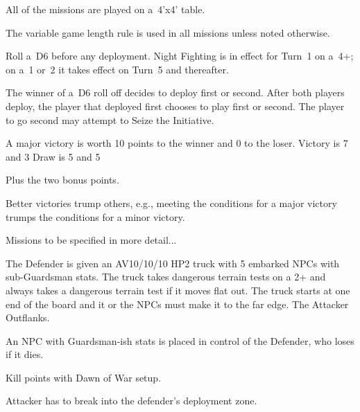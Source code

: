\clearpage

\begin{columns}


\end{columns}


\clearpage
{}


All of the missions are played on a~4'x4' table.

The variable game length rule is used in all missions unless noted otherwise.

  Roll a~D6 before any
deployment.  Night Fighting is in effect for Turn~1 on a~4+; on a~1
or~2 it takes effect on Turn~5 and thereafter.

The winner of a~D6 roll off decides to deploy first or second.  After
both players deploy, the player that deployed first chooses to play
first or second.  The player to go second may attempt to Seize the
Initiative.


A major victory is worth 10 points to the winner and 0 to the loser.
Victory is 7 and 3
Draw is 5 and 5

Plus the two bonus points.

Better victories trump others, e.g., meeting the conditions for a
major victory trumps the conditions for a minor victory.

Missions to be specified in more detail...


The Defender is given an AV10/10/10 HP2 truck with 5 embarked NPCs
with sub-Guardsman stats.  The truck takes dangerous terrain tests on
a 2+ and always takes a dangerous terrain test if it moves flat out.
The truck starts at one end of the board and it or the NPCs must make
it to the far edge.  The Attacker Outflanks.



An NPC with Guardsman-ish stats is placed in control of the Defender,
who loses if it dies.



Kill points with Dawn of War setup.



Attacker has to break into the defender's deployment zone.


